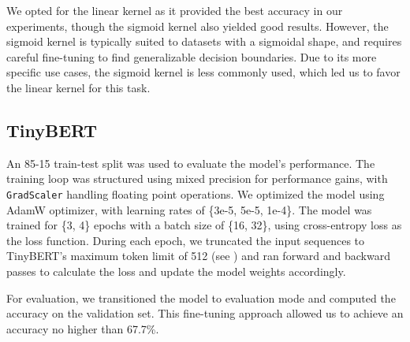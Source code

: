\documentclass[twocolumn]{article}
\begin{document}
We opted for the linear kernel as it provided the best accuracy in our experiments, though the sigmoid kernel also yielded good results. However, the sigmoid kernel is typically suited to datasets with a sigmoidal shape, and requires careful fine-tuning to find generalizable decision boundaries. Due to its more specific use cases, the sigmoid kernel is less commonly used, which led us to favor the linear kernel for this task.

\subsection*{TinyBERT}

An 85-15 train-test split was used to evaluate the model's performance. %
The training loop was structured using mixed precision for performance gains, with \texttt{GradScaler} handling floating point operations. We optimized the model using AdamW optimizer, with learning rates of \{3e-5, 5e-5, 1e-4\}. The model was trained for \{3, 4\} epochs with a batch size of \{16, 32\}, using cross-entropy loss as the loss function. During each epoch, we truncated the input sequences to TinyBERT's maximum token limit of 512 (see  ) and ran forward and backward passes to calculate the loss and update the model weights accordingly.

For evaluation, we transitioned the model to evaluation mode and computed the accuracy on the validation set. This fine-tuning approach allowed us to achieve an accuracy no higher than 67.7\%.
\end{document}
